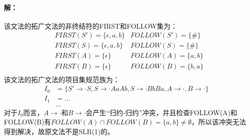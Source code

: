 \paragraph{解：}
该文法的拓广文法的非终结符的FIRST和FOLLOW集为：
\begin{align*}
	&FIRST(S')=\{\epsilon, a, b\} &FOLLOW(S')=\{\#\} \\
	&FIRST(S)=\{\epsilon, a, b\} &FOLLOW(S)=\{\#\} \\
	&FIRST(A)=\{\epsilon\} &FOLLOW(A)=\{a, b\} \\
	&FIRST(B)=\{\epsilon\} &FOLLOW(B)=\{b, a\} \\
\end{align*}
该文法的拓广文法的项目集规范族为：
\begin{align*}
	I_{0}&=\{S' \to \cdot S, S \to \cdot AaAb, S \to \cdot BbBa, A \to \cdot, B \to \cdot\} \\
	I_{1}&={...} \\
	&...
\end{align*}
对于$I_{0}$而言，$A \to \cdot$和$B \to \cdot$会产生“归约-归约”冲突，并且检查FOLLOW(A)和FOLLOW(B)有$FOLLOW(A) \cap FOLLOW(B) = \{a, b\} \neq \emptyset$，所以该冲突无法得到解决，故原文法不是SLR(1)的。